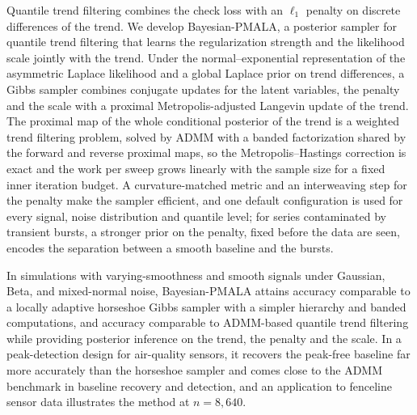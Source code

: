 Quantile trend filtering combines the check loss with an $\ell_1$ penalty on discrete differences of the trend. We develop Bayesian-PMALA, a posterior sampler for quantile trend filtering that learns the regularization strength and the likelihood scale jointly with the trend. Under the normal--exponential representation of the asymmetric Laplace likelihood and a global Laplace prior on trend differences, a Gibbs sampler combines conjugate updates for the latent variables, the penalty and the scale with a proximal Metropolis-adjusted Langevin update of the trend. The proximal map of the whole conditional posterior of the trend is a weighted trend filtering problem, solved by ADMM with a banded factorization shared by the forward and reverse proximal maps, so the Metropolis--Hastings correction is exact and the work per sweep grows linearly with the sample size for a fixed inner iteration budget. A curvature-matched metric and an interweaving step for the penalty make the sampler efficient, and one default configuration is used for every signal, noise distribution and quantile level; for series contaminated by transient bursts, a stronger prior on the penalty, fixed before the data are seen, encodes the separation between a smooth baseline and the bursts.

In simulations with varying-smoothness and smooth signals under Gaussian, Beta, and mixed-normal noise, Bayesian-PMALA attains accuracy comparable to a locally adaptive horseshoe Gibbs sampler with a simpler hierarchy and banded computations, and accuracy comparable to ADMM-based quantile trend filtering while providing posterior inference on the trend, the penalty and the scale. In a peak-detection design for air-quality sensors, it recovers the peak-free baseline far more accurately than the horseshoe sampler and comes close to the ADMM benchmark in baseline recovery and detection, and an application to fenceline sensor data illustrates the method at $n = 8{,}640$.


